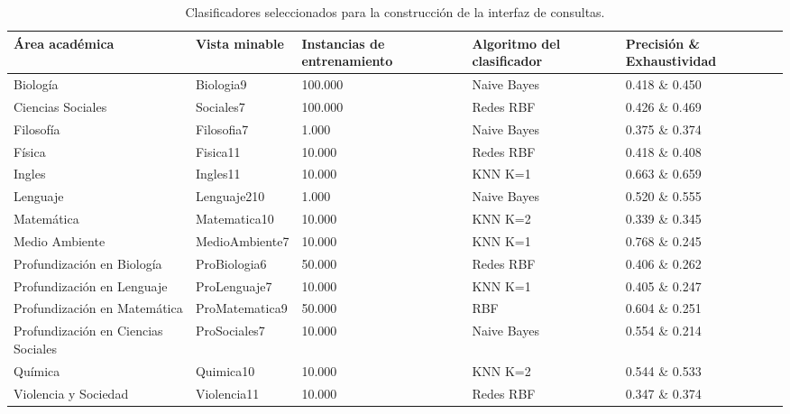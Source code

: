 \clearpage
\begin{table}[!Hhtbp]
\centering
\begin{tabular}{|p{3.5cm}|p{3cm}|p{2cm}|p{3cm}|p{3cm}|}
\hline
	\rowcolor[gray]{0.9} 
	\textbf{Área académica} &
	\textbf{Vista minable} &
	\textbf{Instancias de entrenamiento} &
	\textbf{Algoritmo del clasificador} &
	\textbf{Precisión \& Exhaustividad}
	\\
\hline
Biología & Biologia9 & 100.000 & Naive Bayes & 0.418 \& 0.450 \\
\hline
Ciencias Sociales & Sociales7 & 100.000 & Redes RBF & 0.426	\& 0.469\\
\hline
Filosofía & Filosofia7 & 1.000 & Naive Bayes & 0.375 \& 0.374\\
\hline
Física & Fisica11 & 10.000 & Redes RBF & 0.418 \& 0.408\\
\hline
Ingles & Ingles11 & 10.000 & KNN K=1 & 0.663 \& 0.659\\
\hline
Lenguaje & Lenguaje210 & 1.000 & Naive Bayes & 0.520 \& 0.555\\
\hline
Matemática & Matematica10 & 10.000 & KNN K=2 & 0.339 \& 0.345\\
\hline
Medio Ambiente & MedioAmbiente7 & 10.000 & KNN K=1 & 0.768 \& 0.245 \\
\hline
Profundización en Biología & ProBiologia6 & 50.000 & Redes RBF & 0.406 \& 0.262\\
\hline
Profundización en Lenguaje & ProLenguaje7 & 10.000 & KNN K=1 & 0.405 \& 0.247 \\
\hline
Profundización en Matemática & ProMatematica9 & 50.000 & RBF & 0.604 \& 0.251 \\
\hline
Profundización en Ciencias Sociales & ProSociales7 & 10.000 & Naive Bayes & 0.554 \& 0.214 \\
\hline
Química & Quimica10 & 10.000 & KNN K=2 & 0.544 \& 0.533 \\
\hline
Violencia y Sociedad & Violencia11 & 10.000 & Redes RBF & 0.347 \& 0.374\\
\hline
\end{tabular}
\caption{Clasificadores seleccionados para la construcción de la interfaz de consultas.}
\label{tab:cuadro38}
\end{table}